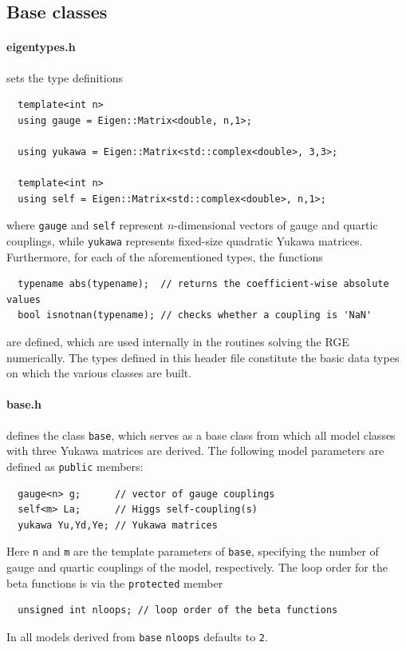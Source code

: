 \documentclass[preprint,12pt]{elsarticle}
\begin{document}
\subsection{\label{sec::base} Base classes}
\paragraph{eigentypes.h}
sets the type definitions
\begin{lstlisting}
  template<int n>
  using gauge = Eigen::Matrix<double, n,1>;
   
  using yukawa = Eigen::Matrix<std::complex<double>, 3,3>;

  template<int n>
  using self = Eigen::Matrix<std::complex<double>, n,1>;
\end{lstlisting}
where \texttt{gauge} and \texttt{self} represent $n$-dimensional vectors of gauge and quartic couplings, while \texttt{yukawa} represents fixed-size quadratic Yukawa matrices.
Furthermore, for each of the aforementioned types, the functions
\begin{lstlisting}
  typename abs(typename);  // returns the coefficient-wise absolute values
  bool isnotnan(typename); // checks whether a coupling is 'NaN'
\end{lstlisting}
are defined, which are used internally in the routines solving the RGE numerically.
The types defined in this header file constitute the basic data types on which the various classes are built.

\paragraph{base.h}
defines the class \texttt{base}, which serves as a base class from which all model classes with three Yukawa matrices are derived. The following model parameters are defined as \texttt{public} members:
\begin{lstlisting}
  gauge<n> g;      // vector of gauge couplings
  self<m> La;      // Higgs self-coupling(s)
  yukawa Yu,Yd,Ye; // Yukawa matrices
\end{lstlisting}
Here \texttt{n} and \texttt{m} are the template parameters of \texttt{base}, specifying the number of gauge and quartic couplings of the model, respectively.
The loop order for the beta functions is via the \texttt{protected} member
\begin{lstlisting}
  unsigned int nloops; // loop order of the beta functions
\end{lstlisting}
In all models derived from \texttt{base} \texttt{nloops} defaults to \texttt{2}.
\end{document}
